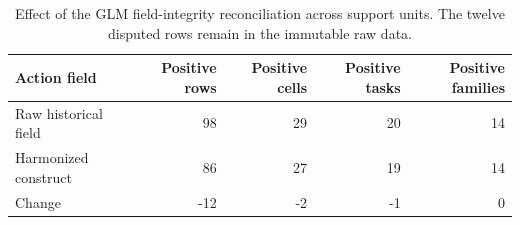 
\begin{table}[H]
\centering
\caption{Effect of the GLM field-integrity reconciliation across support units. The twelve disputed rows remain in the immutable raw data.}
\label{tab:construct-audit}
\small
\begin{tabular}{@{}lrrrr@{}}
\toprule
Action field & Positive rows & Positive cells & Positive tasks & Positive families \\
\midrule
Raw historical field & 98 & 29 & 20 & 14 \\
Harmonized construct & 86 & 27 & 19 & 14 \\
Change & -12 & -2 & -1 & 0 \\
\bottomrule
\end{tabular}
\end{table}
